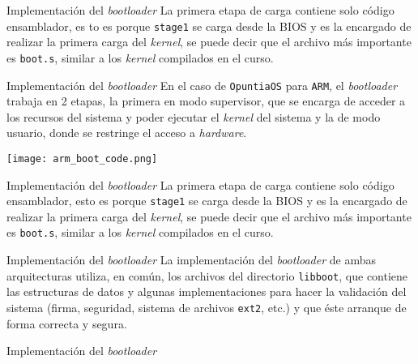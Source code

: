 \begin{frame}{Implementación del \textit{bootloader}}
	La primera etapa de carga contiene solo código ensamblador, es to es porque \texttt{stage1} se carga desde la BIOS y es la encargado de realizar la primera carga del \textit{kernel}, se puede decir que el archivo más importante es \texttt{boot.s}, similar a los \textit{kernel} compilados en el curso.
\end{frame}


\begin{frame}{Implementación del \textit{bootloader}}
	En el caso de \texttt{OpuntiaOS} para \texttt{ARM}, el \textit{bootloader} trabaja en 2 etapas, la primera en modo supervisor, que se encarga de acceder a los recursos del sistema y poder ejecutar el \textit{kernel} del sistema y la de modo usuario, donde se restringe el acceso a \textit{hardware}.
	\begin{center}
		\texttt{[image: arm\_boot\_code.png]}
	\end{center}
\end{frame}

\begin{frame}{Implementación del \textit{bootloader}}
	La primera etapa de carga contiene solo código ensamblador, esto es porque \texttt{stage1} se carga desde la BIOS y es la encargado de realizar la primera carga del \textit{kernel}, se puede decir que el archivo más importante es \texttt{boot.s}, similar a los \textit{kernel} compilados en el curso.
\end{frame}

\begin{frame}{Implementación del \textit{bootloader}}
	La implementación del \textit{bootloader} de ambas arquitecturas utiliza, en común, los archivos del directorio \texttt{libboot}, que contiene las estructuras de datos y algunas implementaciones para hacer la validación del sistema (firma, seguridad, sistema de archivos \texttt{ext2}, etc.) y que éste arranque de forma correcta y segura.
\end{frame}

\begin{frame}{Implementación del \textit{bootloader}}
	\begin{figure}[ht]
		\centering
		\hspace*{1cm}
	\end{figure}
\end{frame}


